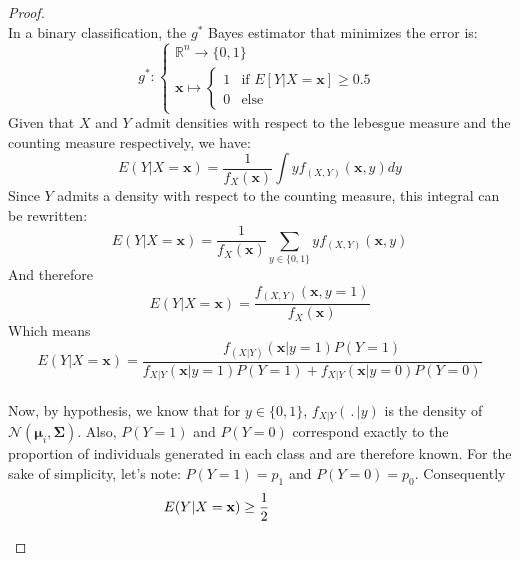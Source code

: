 \documentclass[preprint,12pt]{elsarticle}
\begin{document}
\begin{proof} \phantom{A}\\
In a binary classification, the $g^*$ Bayes estimator that minimizes the error is:\\
\begin{equation}
    g^* : \begin{cases}
    \mathbb{R}^n \longrightarrow \{0, 1\} \\[3 pt]
    \mathbf{x} \longmapsto 
    \begin{cases}
        1 & \text{if } E[Y|X = \mathbf{x}] \geq 0.5  \\
        0 & \text{else}
    \end{cases}
    \end{cases}
\end{equation}
Given that $X$ and $Y$ admit densities with respect to the lebesgue measure and the counting measure respectively, we have:
\begin{equation}
    E(Y|X = \mathbf{x}) = \frac{1}{f_X(\mathbf{x})} \int\limits yf_{(X, Y)}(\mathbf{x}, y) dy
\end{equation}
Since $Y$ admits a density with respect to the counting measure, this integral can be rewritten:
\begin{equation}
    E(Y|X = \mathbf{x}) = \frac{1}{f_X(\mathbf{x})} \sum\limits_{y \in \{0,1\}} yf_{(X, Y)}(\mathbf{x}, y) 
\end{equation}
And therefore
\begin{equation}
    E(Y|X = \mathbf{x}) = \frac{f_{(X, Y)}(\mathbf{x}, y = 1)}{f_X(\mathbf{x})}
\end{equation}
Which means
\begin{equation}
    E(Y|X = \mathbf{x}) = \frac{f_{(X| Y)}(\mathbf{x}| y = 1) P(Y = 1)}{f_{X|Y}(\mathbf{x} | y = 1) P(Y = 1) + f_{X|Y}(\mathbf{x} | y = 0) P(Y = 0)}
\end{equation}
\phantom{a}\\
Now, by hypothesis, we know that for $y \in \{0, 1\}$, $f_{X|Y}(\,.\, |y)$ is the density of $\mathcal{N}(\bm{\mu}_i, \bm{\Sigma})$. Also, $P(Y = 1)$ and $P(Y = 0)$ correspond exactly to the proportion of individuals generated in each class and are therefore known. For the sake of simplicity, let's note: $P(Y = 1) = p_1$ and $P(Y = 0) = p_0$. Consequently\\ 
 \begin{align}
    & E(Y|X = \mathbf{x}) \geq \frac{1}{2} \hspace{2 cm} \phantom{2}  \\[5 pt]

\end{align}
\end{proof}
\end{document}
